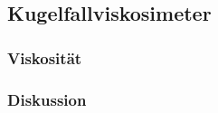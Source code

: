 \newpage
\subsection{Kugelfallviskosimeter}
	\subsubsection{Viskosität}
	\subsubsection{Diskussion}
